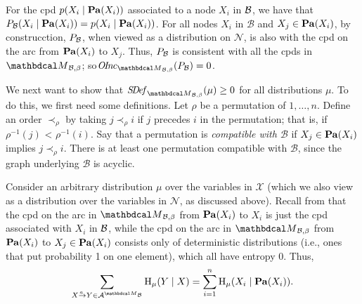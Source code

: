 \begin{subappendices}
%

\begin{lproof}\label{proof:bns-are-pdgs}
  For the cpd $p(X_i \mid \Pa(X_i))$ associated to a node $X_i$ in 
$\cal B$, we have that $\Pr_{\cal B}(X_i
\mid \Pa(X_i)) = p(X_i \mid \Pa(X_i))$.  
For all nodes $X_i$ in $\mathcal B$ and $X_j \in \Pa(X_i)$, 
by construcction, $\Pr_{\cal B}$, when viewed as a distribution on
$\mathcal N$, is also with the cpd on the arc from $\Pa(X_i)$ to
$X_j$.
Thus, $\Pr_{\cal B}$ is consistent with all the cpds in
$\PDGof{\mathcal B, \beta}$;
so$\OInc_{\PDGof{\mathcal B,\beta}}(\Pr_{\cal B}) = 0$.

We next want to show  that $\SDef_{\PDGof{\mathcal B,\beta}}(\mu) \ge 0$ for all
distributions $\mu$.  To do this, we first need some definitions.
Let $\rho$ be a permutation of $1, \ldots,  n$.  Define an order
$\prec_{\rho}$ by taking $j \prec_{\rho} i$ if $j$ precedes $i$ in the
permutation; that is, if 
$\rho^{-1}(j)$ < $\rho^{-1}(i)$. Say that a permutation is \emph{compatible with
  $\mathcal B$} if $X_j \in \Pa(X_i)$ implies $j \prec_{\rho} i$.   There
is at least one permutation compatible with $\mathcal B$, since 
the graph underlying $\mathcal B$ is acyclic.
  
Consider an arbitrary distribution $\mu$ over the variables in
$\mathcal X$ (which we also view as a distribution over the variables
in $\mathcal N$, as discussed above).
Recall from 
that the cpd on the arc in $\PDGof{{\cal B},\beta}$ from $\Pa(X_i)$ to $X_i$
is just the cpd associated with $X_i$ in ${\cal B}$, while the cpd on
the arc in $\PDGof{{\cal B},\beta}$ from $\Pa(X_i)$ to $X_j \in \Pa(X_i)$
consists only of deterministic distributions (i.e., ones that put
probability 1 on one element), which all have entropy 0.  
Thus,
\begin{equation}\label{eq:fact2}
\sum_{\ed aXY \in \Ar^{\PDGof{\mathcal B}}} \H_\mu(Y\mid
X)=\sum_{i=1}^n \H_\mu(X_i \mid \Pa(X_i)). 
\end{equation}


\end{lproof}
\end{subappendices}
